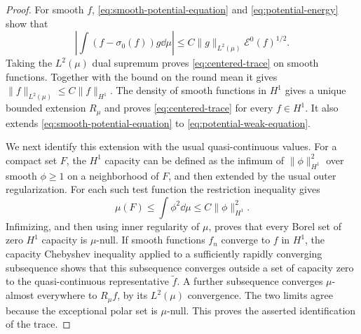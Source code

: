 \begin{proof}
For smooth $f$, \eqref{eq:smooth-potential-equation} and
\eqref{eq:potential-energy} show that
\[
 \left|\int (f-\sigma_0(f))g\dd\mu\right|
 \le C\|g\|_{L^2(\mu)}\mathcal E^0(f)^{1/2}.
\]
Taking the $L^2(\mu)$ dual supremum proves \eqref{eq:centered-trace} on
smooth functions.  Together with the bound on the round mean it gives
$\|f\|_{L^2(\mu)}\le C\|f\|_{H^1}$.  The density of smooth functions in
$H^1$ gives a unique bounded extension $R_\mu$ and proves
\eqref{eq:centered-trace} for every $f\in H^1$.  It also extends
\eqref{eq:smooth-potential-equation} to \eqref{eq:potential-weak-equation}.

We next identify this extension with the usual quasi-continuous values.
For a compact set $F$, the $H^1$ capacity can be defined as the infimum
of $\|\phi\|_{H^1}^2$ over smooth $\phi\ge1$ on a neighborhood of $F$,
and then extended by the usual outer regularization.  For each such
test function the restriction inequality gives
\[
 \mu(F)\le\int \phi^2\dd\mu\le C\|\phi\|_{H^1}^2.
\]
Infimizing, and then using inner regularity of $\mu$, proves that every
Borel set of zero $H^1$ capacity is $\mu$-null.  If smooth functions
$f_n$ converge to $f$ in $H^1$, the capacity Chebyshev inequality applied
to a sufficiently rapidly converging subsequence shows that this
subsequence converges outside a set of capacity zero to the
quasi-continuous representative $\widetilde f$.  A further subsequence
converges $\mu$-almost everywhere to $R_\mu f$, by its $L^2(\mu)$
convergence.  The two limits agree because the exceptional polar set is
$\mu$-null.  This proves the asserted identification of the trace.


\end{proof}
